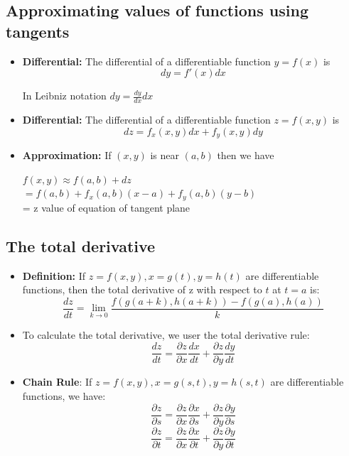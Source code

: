 \documentclass{article}
\begin{document}
  \subsection*{Approximating values of functions using tangents}
  \begin{itemize}
    \item \textbf{Differential:} The differential of a differentiable function $y = f(x)$ is 
    $$
      dy = f'(x)dx
    $$

    In Leibniz notation $dy = \frac{dy}{dx}dx$

    \item \textbf{Differential:} The differential of a differentiable function $z = f(x,y)$ is 
    $$
    dz = f_x(x,y)dx + f_y(x,y)dy
    $$

    \item \textbf{Approximation:} If $(x,y)$ is near $(a,b)$ then we have
    \begin{center}
      $ f(x,y) \approx f(a,b) + dz $\\
      $= f(a,b) + f_x(a,b)(x-a) +f_y(a,b)(y-b)$\\
      = z value of equation of tangent plane
    \end{center}
  \end{itemize}

  \subsection*{The total derivative}
  \begin{itemize}
    \item \textbf{Definition:} If $z = f(x,y), x = g(t),y = h(t)$ are differentiable functions, then the total derivative of z with respect to $t$ at $t = a$ is:
    $$
      \frac{dz}{dt} = \lim_{k \to 0} \frac{f(g(a+k), h(a+k)) - f(g(a), h(a))}{k}
    $$

    \item To calculate the total derivative, we user the total derivative rule:
    $$
      \frac{dz}{dt} = \frac{\partial z}{\partial x} \frac{dx}{dt} + \frac{\partial z}{\partial y} \frac{dy}{dt}
    $$

    \item \textbf{Chain Rule}: If $z = f(x,y),x=g(s,t),y = h(s,t)$ are differentiable functions, we have:
    $$
      \frac{\partial z}{\partial s} = \frac{\partial z}{\partial x} \frac{\partial x}{\partial s} + \frac{\partial z}{\partial y} \frac{\partial y}{\partial s}
    $$
    $$
      \frac{\partial z}{\partial t} = \frac{\partial z}{\partial x} \frac{\partial x}{\partial t} + \frac{\partial z}{\partial y} \frac{\partial y}{\partial t}
    $$
  \end{itemize}
\end{document}
